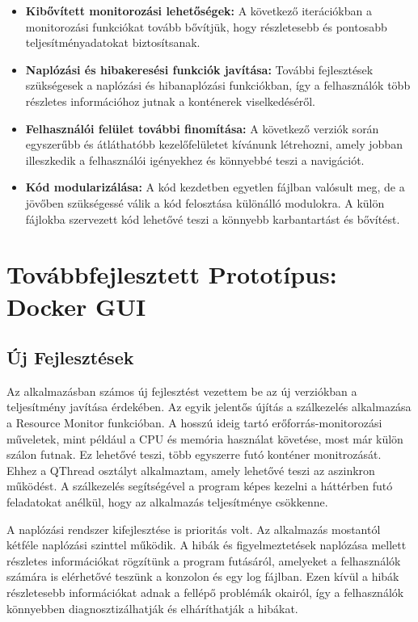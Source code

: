\begin{itemize}
	\item \textbf{Kibővített monitorozási lehetőségek:} A következő iterációkban a monitorozási funkciókat tovább bővítjük, hogy részletesebb és pontosabb teljesítményadatokat biztosítsanak.
	\item \textbf{Naplózási és hibakeresési funkciók javítása:} További fejlesztések szükségesek a naplózási és hibanaplózási funkciókban, így a felhasználók több részletes információhoz jutnak a konténerek viselkedéséről.
	\item \textbf{Felhasználói felület további finomítása:} A következő verziók során egyszerűbb és átláthatóbb kezelőfelületet kívánunk létrehozni, amely jobban illeszkedik a felhasználói igényekhez és könnyebbé teszi a navigációt.
	\item \textbf{Kód modularizálása:} A kód kezdetben egyetlen fájlban valósult meg, de a jövőben szükségessé válik a kód felosztása különálló modulokra. A külön fájlokba szervezett kód lehetővé teszi a könnyebb karbantartást és bővítést.
\end{itemize}

\newpage
\section{Továbbfejlesztett Prototípus: Docker GUI}

\subsection{Új Fejlesztések}

Az alkalmazásban számos új fejlesztést vezettem be az új verziókban a teljesítmény javítása érdekében.
Az egyik jelentős újítás a szálkezelés alkalmazása a Resource Monitor funkcióban. A hosszú ideig tartó erőforrás-monitorozási műveletek, mint például a CPU és memória használat követése, most már külön szálon futnak. Ez lehetővé teszi, több egyszerre futó konténer monitrozását. Ehhez a QThread osztályt alkalmaztam, amely lehetővé teszi az aszinkron működést. A szálkezelés segítségével a program képes kezelni a háttérben futó feladatokat anélkül, hogy az alkalmazás teljesítménye csökkenne.

A naplózási rendszer kifejlesztése is prioritás volt. Az alkalmazás mostantól kétféle naplózási szinttel működik. A hibák és figyelmeztetések naplózása mellett részletes információkat rögzítünk a program futásáról, amelyeket a felhasználók számára is elérhetővé teszünk a konzolon és egy log fájlban. Ezen kívül a hibák részletesebb információkat adnak a fellépő problémák okairól, így a felhasználók könnyebben diagnosztizálhatják és elháríthatják a hibákat.

